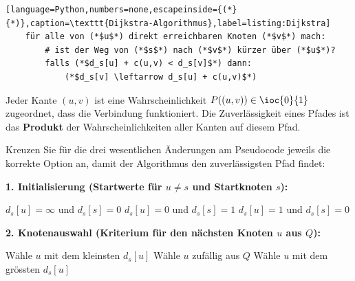 \begin{questions}
\begin{lstlisting}[language=Python,numbers=none,escapeinside={(*}{*)},caption=\texttt{Dijkstra-Algorithmus},label=listing:Dijkstra]
    für alle von (*$u$*) direkt erreichbaren Knoten (*$v$*) mach:
        # ist der Weg von (*$s$*) nach (*$v$*) kürzer über (*$u$*)?
        falls (*$d_s[u] + c(u,v) < d_s[v]$*) dann:
            (*$d_s[v] \leftarrow d_s[u] + c(u,v)$*)
\end{lstlisting}
Jeder Kante $(u, v)$ ist eine Wahrscheinlichkeit $P((u, v)) \in \ioc{0}{1}$ zugeordnet, dass die Verbindung funktioniert. Die Zuverlässigkeit eines Pfades ist das \textbf{Produkt} der Wahrscheinlichkeiten aller Kanten auf diesem Pfad.

Kreuzen Sie für die drei wesentlichen Änderungen am Pseudocode jeweils die korrekte Option an, damit der Algorithmus den zuverlässigsten Pfad findet:

    \textbf{1. Initialisierung (Startwerte für $u \neq s$ und Startknoten $s$):}
    \begin{checkboxes}
        \choice $d_s[u] = \infty$ und $d_s[s] = 0$
        \CorrectChoice $d_s[u] = 0$ und $d_s[s] = 1$
        \choice $d_s[u] = 1$ und $d_s[s] = 0$
    \end{checkboxes}

    \textbf{2. Knotenauswahl (Kriterium für den nächsten Knoten $u$ aus $Q$):}
    \begin{checkboxes}
        \choice Wähle $u$ mit dem kleinsten $d_s[u]$
        \choice Wähle $u$ zufällig aus $Q$
        \CorrectChoice Wähle $u$ mit dem grössten $d_s[u]$
    \end{checkboxes}


\end{questions}

